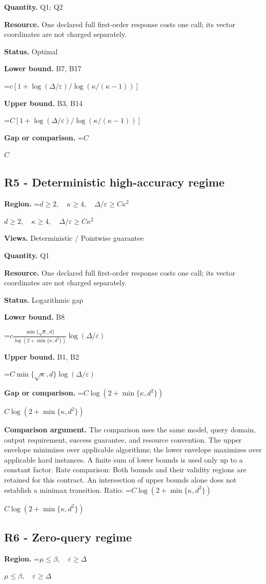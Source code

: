 \documentclass[10pt,a4paper]{article}
\newcommand{\AtlasMath}[1]{\par\begingroup\centering\setbox0=\hbox{$\displaystyle #1$}\ifdim\wd0>1.4\linewidth\typeout{ATLAS WIDE FORMULA: \the\wd0}\fi\ifdim\wd0>\linewidth\resizebox{\linewidth}{!}{\box0}\else\box0\fi\par\endgroup}
\newcommand{\AtlasInlineMath}[1]{\begingroup\setbox0=\hbox{$#1$}\ifdim\wd0>.4\linewidth\endgroup\AtlasMath{#1}\else\endgroup$#1$\fi}
\begin{document}
\textbf{Quantity.} Q1; Q2

\textbf{Resource.} One declared full first-order response costs one call; its vector coordinates are not charged separately.

\textbf{Status.} Optimal

\textbf{Lower bound.} B7, B17

\AtlasMath{c[1+\log(\Delta/\varepsilon)/\log(\kappa/(\kappa-1))]}
\textbf{Upper bound.} B3, B14

\AtlasMath{C[1+\log(\Delta/\varepsilon)/\log(\kappa/(\kappa-1))]}
\textbf{Gap or comparison.} \AtlasInlineMath{C}

\subsection{R5 - Deterministic high-accuracy regime}
\textbf{Region.} \AtlasInlineMath{d\ge2,\quad\kappa\ge4,\quad\Delta/\varepsilon\ge C\kappa^2}

\textbf{Views.} Deterministic / Pointwise guarantee

\textbf{Quantity.} Q1

\textbf{Resource.} One declared full first-order response costs one call; its vector coordinates are not charged separately.

\textbf{Status.} Logarithmic gap

\textbf{Lower bound.} B8

\AtlasMath{c\frac{\min\{\sqrt\kappa,d\}}{\log(2+\min\{\kappa,d^2\})}\log(\Delta/\varepsilon)}
\textbf{Upper bound.} B1, B2

\AtlasMath{C\min\{\sqrt\kappa,d\}\log(\Delta/\varepsilon)}
\textbf{Gap or comparison.} \AtlasInlineMath{C\log(2+\min\{\kappa,d^2\})}

\textbf{Comparison argument.} The comparison uses the same model, query domain, output requirement, success guarantee, and resource convention. The upper envelope minimizes over applicable algorithms; the lower envelope maximizes over applicable hard instances. A finite sum of lower bounds is used only up to a constant factor. Rate comparison: Both bounds and their validity regions are retained for this contract. An intersection of upper bounds alone does not establish a minimax transition. Ratio: \AtlasInlineMath{C\log(2+\min\{\kappa,d^2\})}

\subsection{R6 - Zero-query regime}
\textbf{Region.} \AtlasInlineMath{\mu\le\beta,\quad\varepsilon\ge\Delta}
\end{document}

